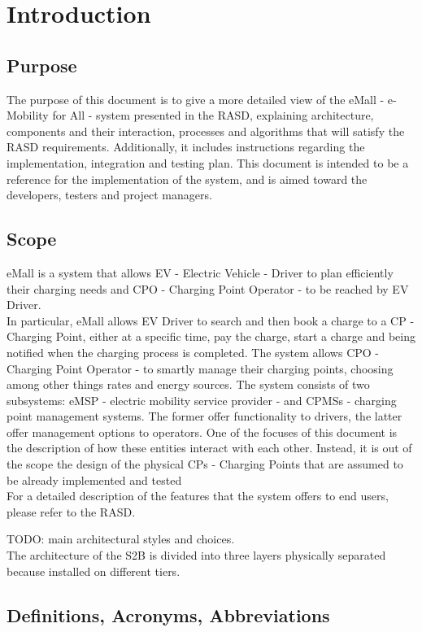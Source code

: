 \section{Introduction}
\subsection{Purpose}

The purpose of this document is to give a more detailed view of the eMall - e-Mobility for All - system presented in
the RASD, explaining architecture, components and their interaction, processes and algorithms that will satisfy the RASD requirements.
Additionally, it includes instructions regarding the implementation, integration and testing plan.
This document is intended to be a reference for the implementation of the system, and is aimed toward the developers, testers and project managers.

\subsection{Scope}
eMall is a system that allows EV - Electric Vehicle - Driver to plan efficiently their charging needs and CPO - Charging Point Operator - to be reached by EV Driver.
\\In particular, eMall allows EV Driver to search and then book a charge to a CP - Charging Point, either at a specific
time, pay the charge, start a charge and being notified when the charging process is completed.
The system allows CPO - Charging Point Operator - to smartly manage their charging points, choosing among other things rates and energy sources.
The system consists of two subsystems: eMSP - electric mobility service provider - and CPMSs - charging point management systems. The former offer functionality to drivers, the latter offer management options to operators. One of the focuses of this document is the description of how these entities interact with each other. Instead, it is out of the scope the design of the physical CPs - Charging Points that are assumed to be already implemented and tested
\\ For a detailed description of the features that the system offers to end users, please refer to the RASD.

TODO: main architectural styles and choices.\\
The architecture of the S2B is divided into three layers physically separated because installed on different tiers.
\subsection{Definitions, Acronyms, Abbreviations}
